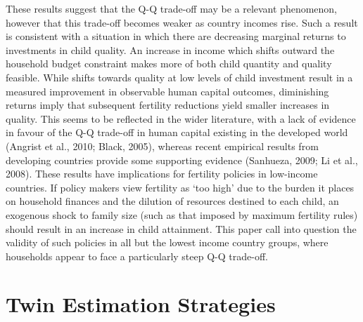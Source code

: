 \documentclass{article}[11pt,subeqn]
\begin{document}
\begin{spacing}{1.5}
These results suggest that the Q-Q trade-off may be a relevant phenomenon, however that this trade-off becomes weaker as country incomes rise.  Such a result is consistent with a situation in which 
there are decreasing marginal returns to investments in child quality.  An increase in income which shifts outward the household budget constraint makes more of both child quantity and quality feasible. While shifts towards quality at low levels of child investment result in a measured improvement in observable human capital outcomes, diminishing returns imply that subsequent fertility reductions yield smaller increases in quality.  This seems to be reflected in the wider literature, with a lack of evidence in favour of the Q-Q trade-off in human capital existing in the developed world (Angrist et al., 2010; Black, 2005), whereas recent empirical results from developing countries provide some supporting evidence (Sanhueza, 2009; Li et al., 2008).  These results have implications for fertility policies in low-income countries.  If policy makers view fertility as `too high' due to the burden it places on household finances and the dilution of resources destined to each child, an exogenous shock to family size (such as that imposed by maximum fertility rules) should result in an increase in child attainment.  This paper call into question the validity of such policies in all but the lowest income country groups, where households appear to face a particularly steep Q-Q trade-off.

\newpage


\newpage
\appendix
\section{Twin Estimation Strategies}
\label{scn:litrev}

\vspace{19.8cm}	


\end{spacing}
\end{document}
